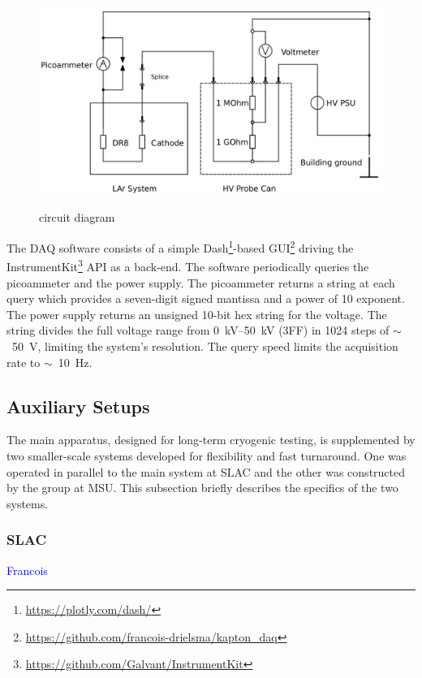 \documentclass[a4paper,12pt]{article}
\begin{document}
\begin{figure}[ht]
	{\includegraphics[width=0.85\linewidth]{circuit.jpg}}
	\caption{circuit diagram}
	\label{fig:circuit}
\end{figure}


The DAQ software consists of a simple Dash\footnote{\href{https://plotly.com/dash/}{https://plotly.com/dash/}}-based GUI\footnote{\href{https://github.com/francois-drielsma/kapton_daq}{https://github.com/francois-drielsma/kapton\_daq}} driving the InstrumentKit\footnote{\href{https://github.com/Galvant/InstrumentKit}{https://github.com/Galvant/InstrumentKit}} API as a back-end. 
The software periodically queries the picoammeter and the power supply. 
The picoammeter returns a string at each query which provides a seven-digit signed mantissa and a power of 10 exponent. 
The power supply returns an unsigned 10-bit hex string for the voltage. 
The string divides the full voltage range from \SIrange{0}{50}{\kilo\volt} (3FF) in 1024 steps of $\sim$~\SI{50}{\volt}, limiting the system's resolution. The query speed limits the acquisition rate to $\sim$~\SI{10}{\hertz}.




\subsection{Auxiliary Setups}
\label{sec:auxsetup}
The main apparatus, designed for long-term cryogenic testing, is supplemented by two smaller-scale systems developed for flexibility and fast turnaround. One was operated in parallel to the main system at SLAC and the other was constructed by the group at MSU. This subsection briefly describes the specifics of the two systems.

\subsubsection{SLAC}
\label{sec:beerBox}
\textcolor{blue}{Francois}
\end{document}
